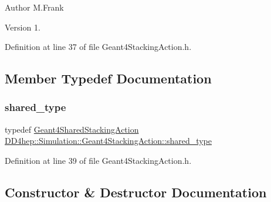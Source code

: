 \begin{DoxyAuthor}{Author}
M.\+Frank 
\end{DoxyAuthor}
\begin{DoxyVersion}{Version}
1. 
\end{DoxyVersion}


Definition at line 37 of file Geant4\+Stacking\+Action.\+h.



\subsection{Member Typedef Documentation}
\hypertarget{class_d_d4hep_1_1_simulation_1_1_geant4_stacking_action_a7cb1de3eaba3df79df86318e664968e4}{}\label{class_d_d4hep_1_1_simulation_1_1_geant4_stacking_action_a7cb1de3eaba3df79df86318e664968e4} 
\subsubsection{\texorpdfstring{shared\+\_\+type}{shared\_type}}
{\footnotesize\ttfamily typedef \hyperlink{class_d_d4hep_1_1_simulation_1_1_geant4_shared_stacking_action}{Geant4\+Shared\+Stacking\+Action} \hyperlink{class_d_d4hep_1_1_simulation_1_1_geant4_stacking_action_a7cb1de3eaba3df79df86318e664968e4}{D\+D4hep\+::\+Simulation\+::\+Geant4\+Stacking\+Action\+::shared\+\_\+type}}



Definition at line 39 of file Geant4\+Stacking\+Action.\+h.



\subsection{Constructor \& Destructor Documentation}
\hypertarget{class_d_d4hep_1_1_simulation_1_1_geant4_stacking_action_aecdcf9e00ad164f12b6db14e61aa2693}{}\label{class_d_d4hep_1_1_simulation_1_1_geant4_stacking_action_aecdcf9e00ad164f12b6db14e61aa2693} 
